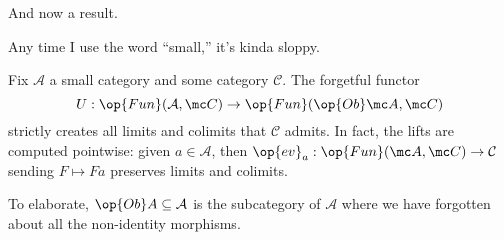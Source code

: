 \documentclass[../notes.tex]{subfiles}
\begin{document}
And now a result.
\begin{quot}[Bryce]
	Any time I use the word ``small,'' it's kinda sloppy.
\end{quot}
\begin{proposition} \label{prop:limitspointwise}
	Fix $\mathcal A$ a small category and some category $\mathcal C$. The forgetful functor
	\[U:\op{Fun}(\mathcal A,\mc C)\to\op{Fun}(\op{Ob}\mc A,\mc C)\]
	strictly creates all limits and colimits that $\mathcal C$ admits. In fact, the lifts are computed pointwise: given $a\in\mathcal A$, then $\op{ev}_a:\op{Fun}(\mc A,\mc C)\to\mathcal C$ sending $F\mapsto Fa$ preserves limits and colimits.
\end{proposition}
To elaborate, $\op{Ob}A\subseteq\mathcal A$ is the subcategory of $\mathcal A$ where we have forgotten about all the non-identity morphisms.
\end{document}
